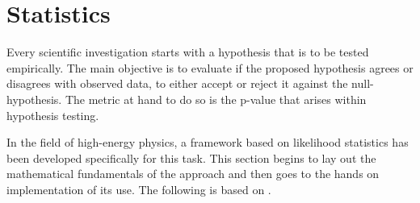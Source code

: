 \section{Statistics}\label{sec:statistics}

Every scientific investigation starts with a hypothesis that is to be tested empirically. The main objective is to evaluate if the proposed hypothesis agrees or disagrees with observed data, to either accept or reject it against the null-hypothesis. The metric at hand to do so is the p-value that arises within hypothesis testing. 

In the field of high-energy physics, a framework based on likelihood statistics has been developed specifically for this task. This section begins to lay out the mathematical fundamentals of the approach and then goes to the hands on implementation of its use. The following is based on \citep{cowan2011asymptotic,behnke2013data,pyhf_intro}.

